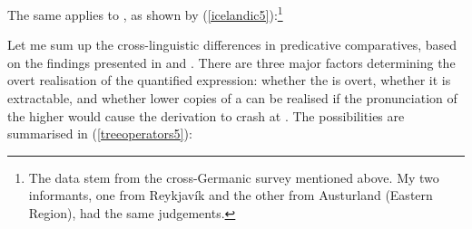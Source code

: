 \ea \label{norwegian5}
\z
\z

The same applies to , as shown by (\ref{icelandic5}):\footnote{The  data stem from the cross-Germanic survey mentioned above. My two informants, one from Reykjavík and the other from Austurland (Eastern Region), had the same judgements.}

\ea \label{icelandic5}
\z
\z

Let me sum up the cross-linguistic differences in predicative comparatives, based on the findings presented in  and . There are three major factors determining the overt realisation of the quantified expression: whether the  is overt, whether it is extractable, and whether lower copies of a  can be realised if the pronunciation of the higher  would cause the derivation to crash at . The possibilities are summarised in (\ref{treeoperators5}):

